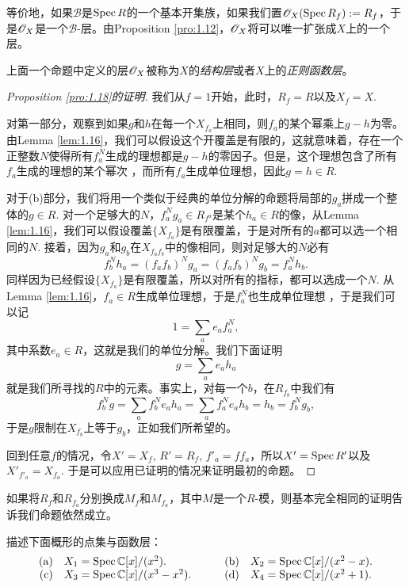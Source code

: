 等价地，如果$\mathscr{B}$是$\operatorname{Spec} R$的一个基本开集族，如果我们置$\mathscr{O}_X(\operatorname{Spec} R_f):=R_f$，于是$\mathscr{O}_X$是一个$\mathscr{B}$\hyp 层。由Proposition \ref{pro:1.12}，$\mathscr{O}_X$将可以唯一扩张成$X$上的一个层。

\begin{defi}
	上面一个命题中定义的层$\mathscr{O}_X$被称为$X$的\textit{结构层}或者$X$上的\textit{正则函数层}。
\end{defi}

\begin{proof}[Proposition \ref{pro:1.18}的证明]
我们从$f=1$开始，此时，$R_f=R$以及$X_f=X$.

对第一部分，观察到如果$g$和$h$在每一个$X_{f_a}$上相同，则$f_a$的某个幂乘上$g-h$为零。由Lemma \ref{lem:1.16}，我们可以假设这个开覆盖是有限的，这就意味着，存在一个正整数$N$使得所有$f_a^N$生成的理想都是$g-h$的零因子。但是，这个理想包含了所有$f_a$生成的理想的某个幂次%
，而所有$f_a$生成单位理想，因此$g=h\in R$.

对于(b)部分，我们将用一个类似于经典的单位分解的命题将局部的$g_a$拼成一个整体的$g\in R$. 对一个足够大的$N$，$f_a^Ng_a\in R_{f^a}$是某个$h_a\in R$的像，从Lemma \ref{lem:1.16}，我们可以假设覆盖$\{X_{f_a}\}$是有限覆盖，于是对所有的$a$都可以选一个相同的$N$. 接着，因为$g_a$和$g_b$在$X_{f_af_b}$中的像相同，则对足够大的$N$必有
\[
	f_b^Nh_a=(f_af_b)^Ng_a=(f_af_b)^Ng_b=f_a^Nh_b.
\]
同样因为已经假设$\{X_{f_a}\}$是有限覆盖，所以对所有的指标，都可以选成一个$N$. 从Lemma \ref{lem:1.16}，$f_a\in R$生成单位理想，于是$f_a^N$也生成单位理想%
，于是我们可以记
\[
	1=\sum_a e_a f_a^N,
\]
其中系数$e_a\in R$，这就是我们的单位分解。我们下面证明
\[
	g=\sum_a e_ah_a
\]
就是我们所寻找的$R$中的元素。事实上，对每一个$b$，在$R_{f_b}$中我们有
\[
	f_b^N g =\sum_a f_b^N e_ah_a=\sum_a f_a^N e_a h_b=h_b=f_b^N g_b,
\]
于是$g$限制在$X_{f_b}$上等于$g_b$，正如我们所希望的。

回到任意$f$的情况，令$X'=X_f$, $R'=R_f$, $f'_a=ff_a$，所以$X'=\operatorname{Spec} R'$以及$X'_{f'_a}=X_{f_a}$. 于是可以应用已证明的情况来证明最初的命题。
\end{proof}

如果将$R_f$和$R_{f_a}$分别换成$M_f$和$M_{f_a}$，其中$M$是一个$R$\hyp 模，则基本完全相同的证明告诉我们命题依然成立。

\begin{exe}\label{exe:1.20}
描述下面概形的点集与函数层：
\[
\begin{array}{rlcrl}
\text{(a)} & X_1=\operatorname{Spec} \mathbb{C}[x]/(x^2).    &\quad & \text{(b)} & X_2=\operatorname{Spec} \mathbb{C}[x]/(x^2-x).\\
\text{(c)} & X_3=\operatorname{Spec} \mathbb{C}[x]/(x^3-x^2).&\quad & \text{(d)} & X_4=\operatorname{Spec} \mathbb{C}[x]/(x^2+1).
\end{array}
\]
\end{exe}

